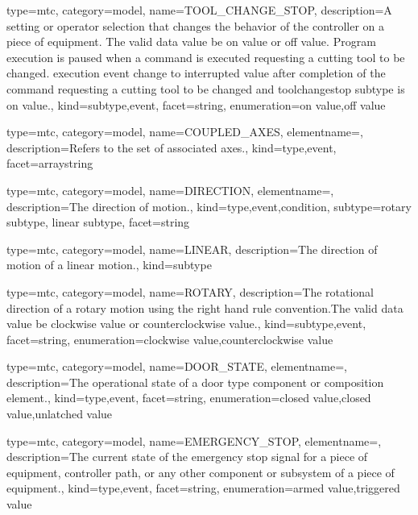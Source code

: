 {
  type=mtc,
  category=model,
  name={TOOL\_CHANGE\_STOP},
  description={A setting or operator selection that changes the behavior of the controller on a piece of equipment. \newline The \gls{valid data value} \must be \gls{on value} or \gls{off value}. \newline Program execution is paused when a command is executed requesting a cutting tool to be changed. \newline \gls{execution event} \must change to \gls{interrupted value} after completion of the command requesting a cutting tool to be changed and \gls{toolchangestop subtype} is \gls{on value}.},
  kind={subtype,event},
  facet={\gls{string}},
  enumeration={\gls{on value},\gls{off value}}
}


{
  type=mtc,
  category=model,
  name={COUPLED\_AXES},
  elementname=,
  description={Refers to the set of associated axes.},
  kind={type,event},
  facet={\gls{arraystring}}
}


{
  type=mtc,
  category=model,
  name={DIRECTION},
  elementname=,
  description={The direction of motion.},
  kind={type,event,condition},
  subtype={\gls{rotary subtype}, \gls{linear subtype}},
  facet={\gls{string}}
}


{
  type=mtc,
  category=model,
  name={LINEAR},
  description={The direction of motion of a linear motion.},
  kind={subtype}
}


{
  type=mtc,
  category=model,
  name={ROTARY},
  description={The rotational direction of a rotary motion using the right hand rule convention.\newline The \gls{valid data value} \must be \gls{clockwise value} or \gls{counterclockwise value}.},
  kind={subtype,event},
  facet={\gls{string}},
  enumeration={\gls{clockwise value},\gls{counterclockwise value}}
}


{
  type=mtc,
  category=model,
  name={DOOR\_STATE},
  elementname=,
  description={The operational state of a \gls{door} type component or composition element.},
  kind={type,event},
  facet={\gls{string}},
  enumeration={\gls{closed value},\gls{closed value},\gls{unlatched value}}
}


{
  type=mtc,
  category=model,
  name={EMERGENCY\_STOP},
  elementname=,
  description={The current state of the emergency stop signal for a piece of equipment, controller path, or any other component or subsystem of a piece of equipment.},
  kind={type,event},
  facet={\gls{string}},
  enumeration={\gls{armed value},\gls{triggered value}}
}


